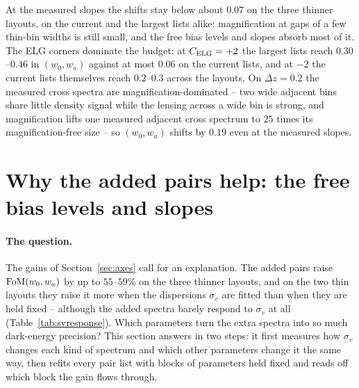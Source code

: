 \documentclass[11pt]{article}
\newcommand{\sv}{\sigma_v}
\begin{document}
At the measured slopes the shifts stay below about $0.07$ on the
three thinner layouts, on the current and the largest lists alike:
magnification at gaps of a few thin-bin widths is still small, and
the free bias levels and slopes absorb most of it.  The ELG corners
dominate the budget: at $C_{\rm ELG} = +2$ the largest lists reach
$0.30$--$0.46$ in $(w_0, w_a)$ against at most $0.06$ on the
current lists, and at $-2$ the current lists themselves reach
$0.2$--$0.3$ across the layouts.  On $\Delta z = 0.2$ the measured
cross spectra are magnification-dominated -- two wide adjacent bins
share little density signal while the lensing across a wide bin is
strong, and magnification lifts one measured adjacent cross
spectrum to $25$ times its magnification-free size -- so
$(w_0, w_a)$ shifts by $0.19$ even at the measured slopes.

\section{Why the added pairs help: the free bias levels and slopes}
\label{sec:bias}

\paragraph{The question.}
The gains of Section~\ref{sec:axes} call for an explanation.  The
added pairs raise ${\rm FoM}(w_0, w_a)$ by up to $55$--$59\%$ on the
three thinner layouts, and on the two thin layouts they raise it
more when the dispersions $\sv$ are fitted than when they are held
fixed -- although the added spectra barely respond to $\sv$ at all
(Table~\ref{tab:svresponse}).  Which parameters turn the extra
spectra into so much dark-energy precision?  This section answers in
two steps: it first measures how $\sv$ changes each kind of spectrum
and which other parameters change it the same way, then refits every
pair list with blocks of parameters held fixed and reads off which
block the gain flows through.
\end{document}
